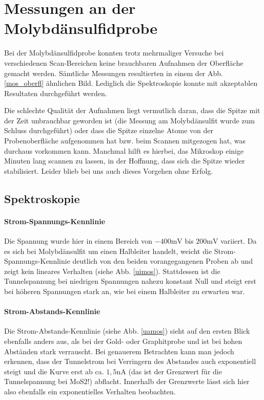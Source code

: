 \section{Messungen an der Molybdänsulfidprobe}

Bei der Molybdänsulfidprobe konnten trotz mehrmaliger Versuche bei verschiedenen Scan-Bereichen keine brauchbaren Aufnahmen der Oberfläche gemacht werden. Sämtliche Messungen resultierten in einem der Abb. \ref{mos_oberfl} ähnlichen Bild. Lediglich die Spektroskopie konnte mit akzeptablen Resultaten durchgeführt werden.

Die schlechte Qualität der Aufnahmen liegt vermutlich daran, dass die Spitze mit der Zeit unbrauchbar geworden ist (die Messung am Molybdänsulfit wurde zum Schluss durchgeführt) oder dass die Spitze einzelne Atome von der Probenoberfläche aufgenommen hat bzw. beim Scannen mitgezogen hat, was durchaus vorkommen kann. Manchmal hilft es hierbei, das Mikroskop einige Minuten lang scannen zu lassen, in der Hoffnung, dass sich die Spitze wieder stabilisiert. Leider blieb bei uns auch dieses Vorgehen ohne Erfolg.

\subsection{Spektroskopie}
\paragraph{Strom-Spannungs-Kennlinie}
Die Spannung wurde hier in einem Bereich von $-400\si{\milli\volt}$ bis $200\si{\milli\volt}$ variiert.
Da es sich bei Molybdänsulfit um einen Halbleiter handelt, weicht die Strom-Spannungs-Kennlinie deutlich von den beiden vorangegangenen Proben ab und zeigt kein lineares Verhalten (siehe Abb. \ref{uimos}). Stattdessen ist die Tunnelspannung bei niedrigen Spannungen nahezu konstant Null und steigt erst bei höheren Spannungen stark an, wie bei einem Halbleiter zu erwarten war.
\paragraph{Strom-Abstands-Kennlinie}
Die Strom-Abstands-Kennlinie (siehe Abb. \ref{uamos}) sieht auf den ersten Blick ebenfalls anders aus, als bei der Gold- oder Graphitprobe und ist bei hohen Abständen stark verrauscht. Bei genauerem Betrachten kann man jedoch erkennen, dass der Tunnelstrom bei Verringern des Abstandes auch exponentiell steigt und die Kurve erst ab ca. $1,5\si{\nano\ampere}$ (das ist der Grenzwert für die Tunnelspannung bei MoS2!) abflacht. Innerhalb der Grenzwerte lässt sich hier also ebenfalls ein exponentielles Verhalten beobachten.

